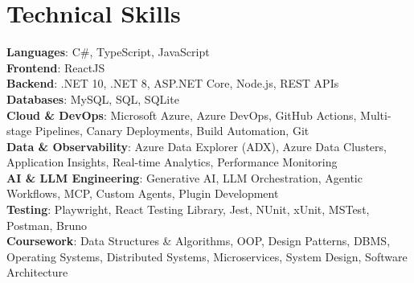 \section{Technical Skills}
\begin{itemize}[leftmargin=0.15in, label={}]
\small{\item{

\textbf{Languages}{: C\#, TypeScript, JavaScript} \\

\textbf{Frontend}{: ReactJS} \\

\textbf{Backend}{: .NET 10, .NET 8, ASP.NET Core, Node.js, REST APIs} \\

\textbf{Databases}{: MySQL, SQL, SQLite} \\

\textbf{Cloud \& DevOps}{: Microsoft Azure, Azure DevOps, GitHub Actions, Multi-stage Pipelines, Canary Deployments, Build Automation, Git} \\

\textbf{Data \& Observability}{: Azure Data Explorer (ADX), Azure Data Clusters, Application Insights, Real-time Analytics, Performance Monitoring} \\

\textbf{AI \& LLM Engineering}{: Generative AI, LLM Orchestration, Agentic Workflows, MCP, Custom Agents, Plugin Development} \\

\textbf{Testing}{: Playwright, React Testing Library, Jest, NUnit, xUnit, MSTest, Postman, Bruno} \\

\textbf{Coursework}{: Data Structures \& Algorithms, OOP, Design Patterns, DBMS, Operating Systems, Distributed Systems, Microservices, System Design, Software Architecture}

}}
\end{itemize}
